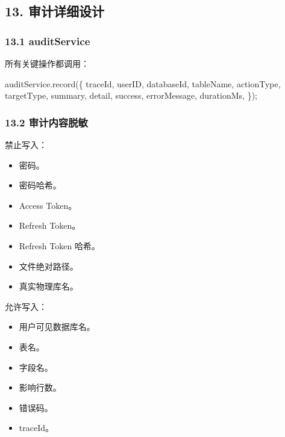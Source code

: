 \documentclass[
  a4paper,
  UTF8]{ctexart}
\newenvironment{Shaded}{}{}
\newcommand{\FunctionTok}[1]{\textcolor[rgb]{0.02,0.16,0.49}{#1}}
\newcommand{\NormalTok}[1]{#1}
\newcommand{\OperatorTok}[1]{\textcolor[rgb]{0.40,0.40,0.40}{#1}}
\providecommand{\tightlist}{%
  \setlength{\itemsep}{0pt}\setlength{\parskip}{0pt}}
\begin{document}
\hypertarget{ux5ba1ux8ba1ux8be6ux7ec6ux8bbeux8ba1}{%
\subsection{13.
审计详细设计}\label{ux5ba1ux8ba1ux8be6ux7ec6ux8bbeux8ba1}}

\hypertarget{auditservice}{%
\subsubsection{13.1 auditService}\label{auditservice}}

所有关键操作都调用：

\begin{Shaded}
\begin{Highlighting}[]
\NormalTok{auditService}\OperatorTok{.}\FunctionTok{record}\NormalTok{(\{}
\NormalTok{  traceId}\OperatorTok{,}
\NormalTok{  userID}\OperatorTok{,}
\NormalTok{  databaseId}\OperatorTok{,}
\NormalTok{  tableName}\OperatorTok{,}
\NormalTok{  actionType}\OperatorTok{,}
\NormalTok{  targetType}\OperatorTok{,}
\NormalTok{  summary}\OperatorTok{,}
\NormalTok{  detail}\OperatorTok{,}
\NormalTok{  success}\OperatorTok{,}
\NormalTok{  errorMessage}\OperatorTok{,}
\NormalTok{  durationMs}\OperatorTok{,}
\NormalTok{\})}\OperatorTok{;}
\end{Highlighting}
\end{Shaded}

\hypertarget{ux5ba1ux8ba1ux5185ux5bb9ux8131ux654f}{%
\subsubsection{13.2
审计内容脱敏}\label{ux5ba1ux8ba1ux5185ux5bb9ux8131ux654f}}

禁止写入：

\begin{itemize}
\tightlist
\item
  密码。
\item
  密码哈希。
\item
  Access Token。
\item
  Refresh Token。
\item
  Refresh Token 哈希。
\item
  文件绝对路径。
\item
  真实物理库名。
\end{itemize}

允许写入：

\begin{itemize}
\tightlist
\item
  用户可见数据库名。
\item
  表名。
\item
  字段名。
\item
  影响行数。
\item
  错误码。
\item
  traceId。
\end{itemize}
\end{document}
